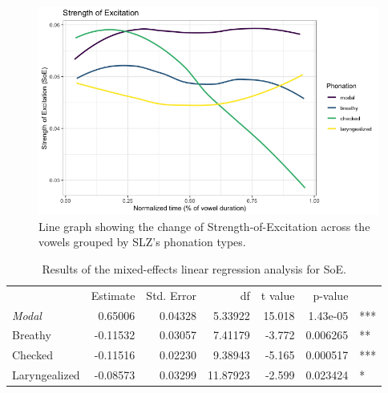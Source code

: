 \documentclass[12pt, letterpaper]{article}
\providecommand{\lsptoprule}{\midrule\toprule}
\providecommand{\lspbottomrule}{\bottomrule\midrule}
\begin{document}
\begin{figure}[!h]
	\centering
	\includegraphics[width=.75\linewidth]{Images/SoE.png}
	\caption{Line graph showing the change of Strength-of-Excitation across the vowels grouped by SLZ's phonation types.}
	\label{fig:SOE}
\end{figure}


\begin{table}[!h]
    \centering
    \caption{Results of the mixed-effects linear regression analysis for SoE.}
    \label{tab:SOE}
    \begin{tabular}{lrrrrrl}
	\lsptoprule
					&  Estimate  & Std. Error & df & t value & p-value & \\
        \textit{Modal}  &   0.65006  &  0.04328 &  5.33922 & 15.018 & 1.43e-05 & *** \\  
  	Breathy   		&  -0.11532  &  0.03057 &  7.41179 & -3.772 & 0.006265 & ** \\
	Checked    		&  -0.11516  &  0.02230 &  9.38943 & -5.165 & 0.000517 & *** \\
	Laryngealized	&  -0.08573  &  0.03299 & 11.87923 & -2.599 & 0.023424 & * \\
    \lspbottomrule
    \end{tabular}
\end{table}

\end{document}

